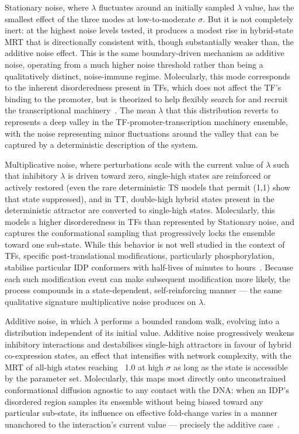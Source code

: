 \documentclass[11pt]{article}
\begin{document}
Stationary noise, where $\lambda$ fluctuates around an initially sampled $\lambda$ value, has the smallest effect of the three modes at low-to-moderate $\sigma$. But it is not completely inert: at the highest noise levels tested, it produces a modest rise in hybrid-state MRT that is directionally consistent with, though substantially weaker than, the additive noise effect. This is the same boundary-driven mechanism as additive noise, operating from a much higher noise threshold rather than being a qualitatively distinct, noise-immune regime. Molecularly, this mode corresponds to the inherent disorderedness present in TFs, which does not affect the TF's binding to the promoter, but is theorized to help flexibly search for and recruit the transcriptional machinery~\cite{Holehouse2023TheRegions, Jonas2025IntrinsicallySearch}. The mean $\lambda$ that this distribution reverts to represents a deep valley in the TF-promoter-transcription machinery ensemble, with the noise representing minor fluctuations around the valley that can be captured by a deterministic description of the system.  

Multiplicative noise, where perturbations scale with the current value of $\lambda$ such that inhibitory $\lambda$ is driven toward zero, single-high states are reinforced or actively restored (even the rare deterministic TS models that permit (1,1) show that state suppressed), and in TT, double-high hybrid states present in the deterministic attractor are converted to single-high states. Molecularly, this models a higher disorderedness in TFs than represented by Stationary noise, and captures the conformational sampling that progressively locks the ensemble toward one sub-state. While this behavior is not well studied in the context of TFs, specific post-translational modifications, particularly phosphorylation, stabilise particular IDP conformers with half-lives of minutes to hours~\cite{Kulkarni2022, Kulkarni2019}. Because each such modification event can make subsequent modification more likely, the process compounds in a state-dependent, self-reinforcing manner --- the same qualitative signature multiplicative noise produces on $\lambda$. 

Additive noise, in which $\lambda$ performs a bounded random walk, evolving into a distribution independent of its initial value. Additive noise progressively weakens inhibitory interactions and destabilises single-high attractors in favour of hybrid co-expression states, an effect that intensifies with network complexity, with the MRT of all-high states reaching ~1.0 at high $\sigma$ as long as the state is accessible by the parameter set. Molecularly, this maps most directly onto unconstrained conformational diffusion agnostic to any contact with the DNA: when an IDP's disordered region samples its ensemble without being biased toward any particular sub-state, its influence on effective fold-change varies in a manner unanchored to the interaction's current value --- precisely the additive case~\cite{Ferrie2022Structure-functionRegulation, Holehouse2023TheRegions}. 
\end{document}
